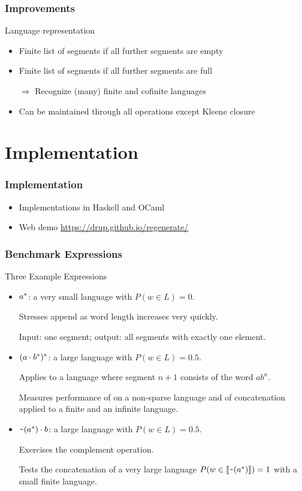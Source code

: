 \documentclass[pdftex,aspectratio=169]{beamer}
\begin{document}
\begin{frame}
  \frametitle{Improvements}
  \begin{block}{Language representation}
  \begin{itemize}
  \item Finite list of segments if all further segments are empty
  \item Finite list of segments if all further segments are full
  \item[$\Rightarrow$] Recognize (many) finite and cofinite languages
  \item Can be maintained through all operations except Kleene closure
  \end{itemize}
\end{block}
\end{frame}
\section{Implementation}
\begin{frame}
  \frametitle{Implementation}
  \begin{itemize}
  \item Implementations in Haskell and OCaml
  \item Web demo \url{https://drup.github.io/regenerate/}
  \end{itemize}
\end{frame}
\begin{frame}
  \frametitle{Benchmark Expressions}
  \vspace{-\baselineskip}
  \begin{block}{Three Example Expressions}
    \begin{itemize}
    \item $a^*$: a very small language with $P (w\in L) = 0$.
      
      Stresses append as word length increases very quickly.
      
      Input: one segment; output: all segments with exactly one element. 
    \item $(a \cdot{b^*})^*$: a large language
      with $P (w\in L)=0.5$.

      Applies  to a language where segment $n+1$ consists of the word $ab^n$.

      Measures performance of  on a non-sparse
      language and of {concatenation} applied to a finite and an infinite
      language.
    \item $\texttt{\textasciitilde}{(a^*)} \cdot{b}$: a large language with
      $P (w\in L) = 0.5$.
      
      Exercises the complement operation.

      Tests the concatenation of a very large language
      $P (w\in \llbracket\texttt{\textasciitilde}{(a^*)}\rrbracket) = 1$ with a small
      finite language.
    \end{itemize}
  \end{block}
\end{frame}
\end{document}
